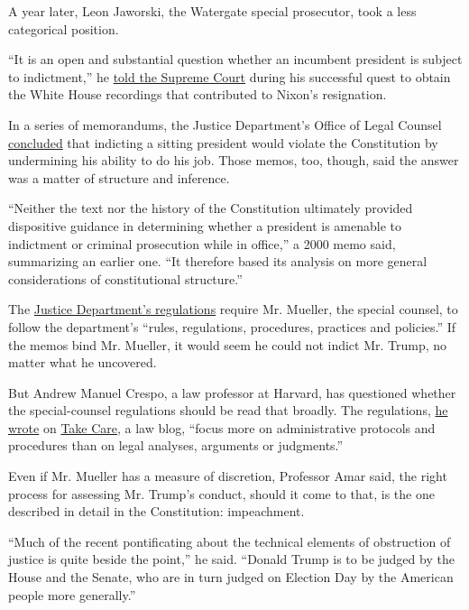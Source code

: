 A year later, Leon Jaworski, the Watergate special prosecutor, took a
less categorical position.

``It is an open and substantial question whether an incumbent president
is subject to indictment,'' he
\href{https://drive.google.com/file/d/0B6mkR0LD6dl3aWJHd3pOUkxWeWc/view}{told
the Supreme Court} during his successful quest to obtain the White House
recordings that contributed to Nixon's resignation.

In a series of memorandums, the Justice Department's Office of Legal
Counsel \href{https://www.justice.gov/file/19351/download}{concluded}
that indicting a sitting president would violate the Constitution by
undermining his ability to do his job. Those memos, too, though, said
the answer was a matter of structure and inference.

``Neither the text nor the history of the Constitution ultimately
provided dispositive guidance in determining whether a president is
amenable to indictment or criminal prosecution while in office,'' a 2000
memo said, summarizing an earlier one. ``It therefore based its analysis
on more general considerations of constitutional structure.''

The \href{https://www.law.cornell.edu/cfr/text/28/600.7}{Justice
Department's regulations} require Mr. Mueller, the special counsel, to
follow the department's ``rules, regulations, procedures, practices and
policies.'' If the memos bind Mr. Mueller, it would seem he could not
indict Mr. Trump, no matter what he uncovered.

But Andrew Manuel Crespo, a law professor at Harvard, has questioned
whether the special-counsel regulations should be read that broadly. The
regulations,
\href{https://takecareblog.com/blog/the-road-to-united-states-v-trump-is-paved-with-prosecutorial-discretion}{he
wrote} on \href{https://takecareblog.com/}{Take Care}, a law blog,
``focus more on administrative protocols and procedures than on legal
analyses, arguments or judgments.''

Even if Mr. Mueller has a measure of discretion, Professor Amar said,
the right process for assessing Mr. Trump's conduct, should it come to
that, is the one described in detail in the Constitution: impeachment.

``Much of the recent pontificating about the technical elements of
obstruction of justice is quite beside the point,'' he said. ``Donald
Trump is to be judged by the House and the Senate, who are in turn
judged on Election Day by the American people more generally.''

